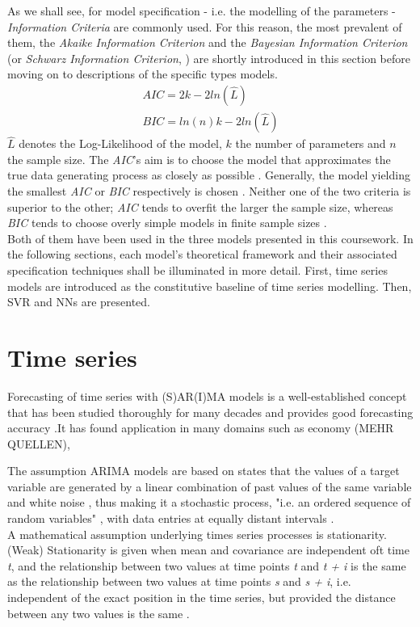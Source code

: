 \documentclass[a4paper, 11pt]{article}
\begin{document}
As we shall see, for model specification - i.e. the modelling of the parameters - \textit{Information Criteria} are commonly used. For this reason, the most prevalent of them, the \textit{Akaike Information Criterion} \cite{Akaike.1974} and the \textit{Bayesian Information Criterion} (or \textit{Schwarz Information Criterion}, \cite{Schwarz.1978}) are shortly introduced in this section before moving on to descriptions of the specific types models.
\begin{align}
AIC = 2k - 2ln(\hat{L})\\
BIC = ln(n)k - 2ln(\hat{L})
\end{align}
$\hat{L}$ denotes the Log-Likelihood of the model, $k$ the number of parameters and $n$ the sample size. The \textit{AIC}'s aim is to choose the model that approximates the true data generating process as closely as possible \cite{Wit.2012}. Generally, the model yielding the smallest \textit{AIC} or \textit{BIC} respectively is chosen \cite{Hastie.2017}.
Neither one of the two criteria is superior to the other; \textit{AIC} tends to overfit the larger the sample size, whereas \textit{BIC} tends to choose overly simple models in finite sample sizes \citep{Hastie.2017}.\\
Both of them have been used in the three models presented in this coursework.
In the following sections, each model's theoretical framework and their associated specification techniques shall be illuminated in more detail. First, time series models are introduced as the constitutive baseline of time series modelling. Then, SVR and NNs are presented.

\section{Time series}
Forecasting of time series with (S)AR(I)MA models is a well-established concept that has been studied thoroughly for many decades and provides good forecasting accuracy \citep{Arlt.2017, Khandelwal.2015}.It has found application in many domains such as economy (MEHR QUELLEN), 

The assumption ARIMA models are based on states that the values of a target variable are generated by a linear combination of past values of the same variable and white noise \citep{Khandelwal.2015}, thus making it a stochastic process, "i.e. an ordered sequence of random variables" \citep{Andreoni.2006b}, with data entries at equally distant intervals \citep{Hunt.2003}.\\
A mathematical assumption underlying times series processes is stationarity.
(Weak) Stationarity is given when mean and covariance are independent oft time \textit{t}, and the relationship between two values at time points \textit{t} and \textit{t + i} is the same as the relationship between two values at time points \textit{s} and \textit{s + i}, i.e. independent of the exact position in the time series, but provided the distance between any two values is the same \citep{Vogel.2015}.\\
\end{document}
